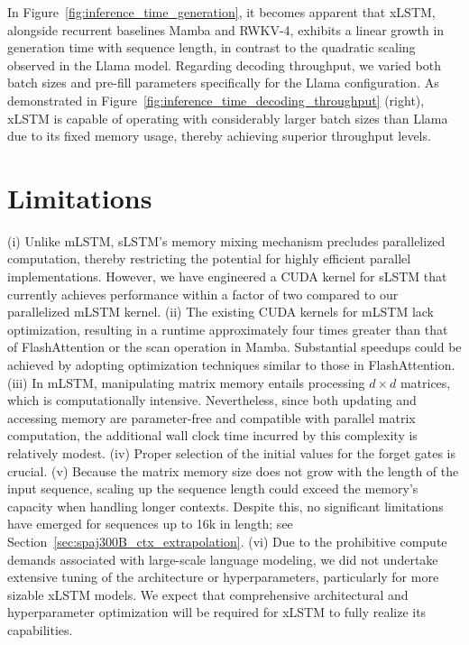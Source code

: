 In Figure~\ref{fig:inference_time_generation}, it becomes apparent that xLSTM, alongside recurrent baselines Mamba and RWKV-4, exhibits a linear growth in generation time with sequence length, in contrast to the quadratic scaling observed in the Llama model. Regarding decoding throughput, we varied both batch sizes and pre-fill parameters specifically for the Llama configuration. As demonstrated in Figure~\ref{fig:inference_time_decoding_throughput} (right), xLSTM is capable of operating with considerably larger batch sizes than Llama due to its fixed memory usage, thereby achieving superior throughput levels.

\section{Limitations}

(i) Unlike mLSTM, sLSTM’s memory mixing mechanism precludes parallelized computation, thereby restricting the potential for highly efficient parallel implementations. However, we have engineered a CUDA kernel for sLSTM that currently achieves performance within a factor of two compared to our parallelized mLSTM kernel. (ii) The existing CUDA kernels for mLSTM lack optimization, resulting in a runtime approximately four times greater than that of FlashAttention or the scan operation in Mamba. Substantial speedups could be achieved by adopting optimization techniques similar to those in FlashAttention. (iii) In mLSTM, manipulating matrix memory entails processing $d \times d$ matrices, which is computationally intensive. Nevertheless, since both updating and accessing memory are parameter-free and compatible with parallel matrix computation, the additional wall clock time incurred by this complexity is relatively modest. (iv) Proper selection of the initial values for the forget gates is crucial. (v) Because the matrix memory size does not grow with the length of the input sequence, scaling up the sequence length could exceed the memory’s capacity when handling longer contexts. Despite this, no significant limitations have emerged for sequences up to 16k in length; see Section~\ref{sec:spaj300B_ctx_extrapolation}. (vi) Due to the prohibitive compute demands associated with large-scale language modeling, we did not undertake extensive tuning of the architecture or hyperparameters, particularly for more sizable xLSTM models. We expect that comprehensive architectural and hyperparameter optimization will be required for xLSTM to fully realize its capabilities.


